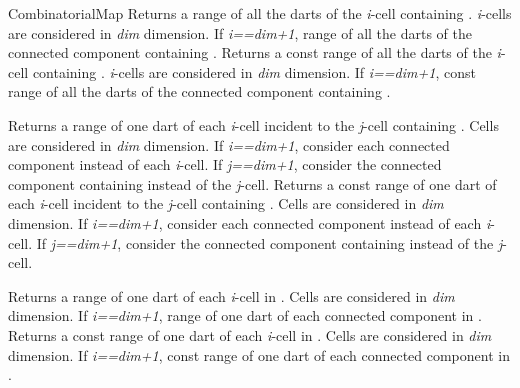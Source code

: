 \begin{ccRefConcept}{CombinatorialMap}
   {Returns a range of all the darts of the \emph{i}-cell containing .
    \emph{i}-cells are considered in \emph{dim} dimension. If \emph{i==dim+1},  
    range of all the darts of the connected component containing .
  }
\ccGlue
{}
   {Returns a const range of all the darts of the \emph{i}-cell containing .
    \emph{i}-cells are considered in \emph{dim} dimension. If \emph{i==dim+1},  
    const range of all the darts of the connected component containing .
   }

   {Returns a range of one dart of each \emph{i}-cell incident to the \emph{j}-cell 
     containing . Cells are considered in \emph{dim} dimension. If \emph{i==dim+1},  
     consider each connected component instead of each \emph{i}-cell. If \emph{j==dim+1},
     consider the connected component containing  instead of the \emph{j}-cell.
     }
\ccGlue
{}
   {Returns a const range of one dart of each \emph{i}-cell incident to the \emph{j}-cell 
     containing . Cells are considered in \emph{dim} dimension. If \emph{i==dim+1},  
     consider each connected component instead of each \emph{i}-cell. If \emph{j==dim+1},
     consider the connected component containing  instead of the \emph{j}-cell.
     }

    {Returns a range of one dart of each \emph{i}-cell in .
     Cells are considered in \emph{dim} dimension. If \emph{i==dim+1},  
     range of one dart of each connected component in .
  }
\ccGlue
{}
    {Returns a const range of one dart of each \emph{i}-cell in .
     Cells are considered in \emph{dim} dimension. If \emph{i==dim+1},  
     const range of one dart of each connected component in .
   }


\end{ccRefConcept}
